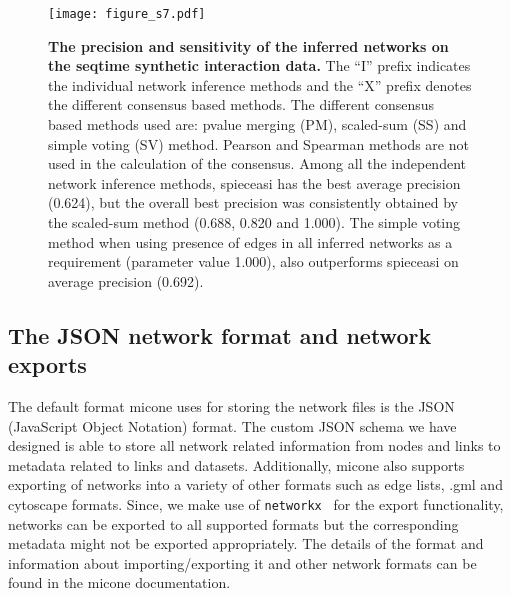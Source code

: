     \begin{figure}[H]
      \centering
      \texttt{[image: figure\_s7.pdf]}
    \end{figure}
    \begin{figure}[H]
      \centering
        \caption{
          \textbf{The precision and sensitivity of the inferred networks on the seqtime synthetic interaction data.}
          The ``I'' prefix indicates the individual network inference methods and the ``X'' prefix denotes the different consensus based methods.
          The different consensus based methods used are: pvalue merging (PM), scaled-sum (SS) and simple voting (SV) method.
          Pearson and Spearman methods are not used in the calculation of the consensus.
          Among all the independent network inference methods, \ac{spieceasi} has the best average precision (0.624), but the overall best precision was consistently obtained by the scaled-sum method (0.688, 0.820 and 1.000).
          The simple voting method when using presence of edges in all inferred networks as a requirement (parameter value 1.000), also outperforms \ac{spieceasi} on average precision (0.692).
        }
      \label{fig:figure_s7}
    \end{figure}
    \FloatBarrier
    \newpage


  \subsection*{The JSON network format and network exports}

    The default format \ac{micone} uses for storing the network files is the JSON (JavaScript Object Notation) format.
    The custom JSON schema we have designed is able to store all network related information from nodes and links to metadata related to links and datasets.
    Additionally, \ac{micone} also supports exporting of networks into a variety of other formats such as edge lists, .gml and cytoscape formats.
    Since, we make use of \texttt{networkx}~\cite{hagbergExploringNetworkStructure2008} for the export functionality, networks can be exported to all supported formats but the corresponding metadata might not be exported appropriately.
    The details of the format and information about importing/exporting it and other network formats can be found in the \ac{micone} documentation.
